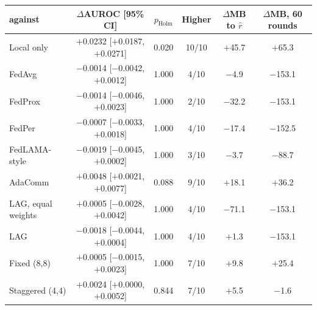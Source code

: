 \begin{tabular}{@{}lccccc@{}}
\toprule
\tierfed{} against & $\Delta$AUROC [95\% CI] & $p_{\mathrm{Holm}}$ & Higher & $\Delta$MB to $\hat r$ & $\Delta$MB, 60 rounds\\
\midrule
Local only & \ensuremath{+}0.0232 [\ensuremath{+}0.0187, \ensuremath{+}0.0271] & 0.020 & 10/10 & \ensuremath{+}45.7 & \ensuremath{+}65.3\\
FedAvg & \ensuremath{-}0.0014 [\ensuremath{-}0.0042, \ensuremath{+}0.0012] & 1.000 & 4/10 & \ensuremath{-}4.9 & \ensuremath{-}153.1\\
FedProx & \ensuremath{-}0.0014 [\ensuremath{-}0.0046, \ensuremath{+}0.0023] & 1.000 & 2/10 & \ensuremath{-}32.2 & \ensuremath{-}153.1\\
FedPer & \ensuremath{-}0.0007 [\ensuremath{-}0.0033, \ensuremath{+}0.0018] & 1.000 & 4/10 & \ensuremath{-}17.4 & \ensuremath{-}152.5\\
FedLAMA-style & \ensuremath{-}0.0019 [\ensuremath{-}0.0045, \ensuremath{+}0.0002] & 1.000 & 3/10 & \ensuremath{-}3.7 & \ensuremath{-}88.7\\
AdaComm & \ensuremath{+}0.0048 [\ensuremath{+}0.0021, \ensuremath{+}0.0077] & 0.088 & 9/10 & \ensuremath{+}18.1 & \ensuremath{+}36.2\\
LAG, equal weights & \ensuremath{+}0.0005 [\ensuremath{-}0.0028, \ensuremath{+}0.0042] & 1.000 & 4/10 & \ensuremath{-}71.1 & \ensuremath{-}153.1\\
LAG & \ensuremath{-}0.0018 [\ensuremath{-}0.0044, \ensuremath{+}0.0004] & 1.000 & 4/10 & \ensuremath{+}1.3 & \ensuremath{-}153.1\\
Fixed (8,8) & \ensuremath{+}0.0005 [\ensuremath{-}0.0015, \ensuremath{+}0.0023] & 1.000 & 7/10 & \ensuremath{+}9.8 & \ensuremath{+}25.4\\
Staggered (4,4) & \ensuremath{+}0.0024 [\ensuremath{+}0.0000, \ensuremath{+}0.0052] & 0.844 & 7/10 & \ensuremath{+}5.5 & \ensuremath{-}1.6\\
\bottomrule
\end{tabular}
